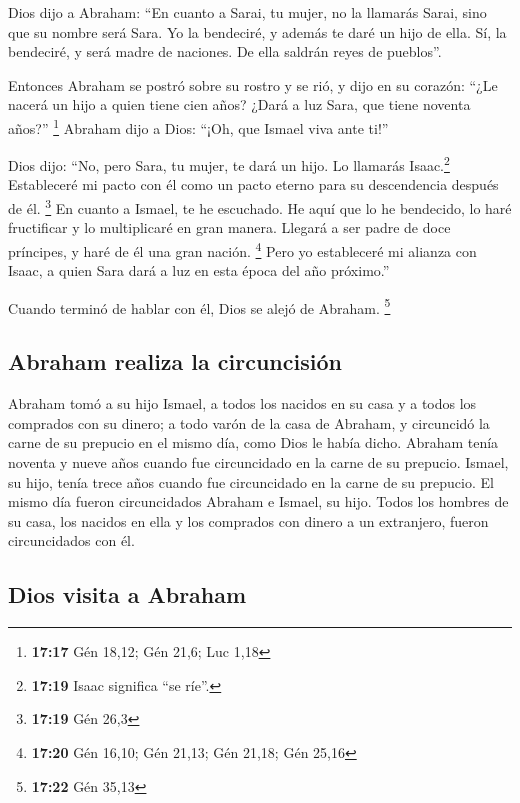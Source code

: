  Dios dijo a Abraham: ``En cuanto a Sarai, tu mujer, no
la llamarás Sarai, sino que su nombre será Sara.  Yo la
bendeciré, y además te daré un hijo de ella. Sí, la bendeciré, y será
madre de naciones. De ella saldrán reyes de pueblos''.

 Entonces Abraham se postró sobre su rostro y se rió, y
dijo en su corazón: ``¿Le nacerá un hijo a quien tiene cien años? ¿Dará
a luz Sara, que tiene noventa años?'' \footnote{\textbf{17:17} Gén
  18,12; Gén 21,6; Luc 1,18}  Abraham dijo a Dios: ``¡Oh,
que Ismael viva ante ti!''

 Dios dijo: ``No, pero Sara, tu mujer, te dará un hijo.
Lo llamarás Isaac.\footnote{\textbf{17:19} Isaac significa ``se ríe''.}
Estableceré mi pacto con él como un pacto eterno para su descendencia
después de él. \footnote{\textbf{17:19} Gén 26,3}  En
cuanto a Ismael, te he escuchado. He aquí que lo he bendecido, lo haré
fructificar y lo multiplicaré en gran manera. Llegará a ser padre de
doce príncipes, y haré de él una gran nación. \footnote{\textbf{17:20}
  Gén 16,10; Gén 21,13; Gén 21,18; Gén 25,16}  Pero yo
estableceré mi alianza con Isaac, a quien Sara dará a luz en esta época
del año próximo.''

 Cuando terminó de hablar con él, Dios se alejó de
Abraham. \footnote{\textbf{17:22} Gén 35,13}

\hypertarget{abraham-realiza-la-circuncisiuxf3n}{%
\subsection{Abraham realiza la
circuncisión}\label{abraham-realiza-la-circuncisiuxf3n}}

 Abraham tomó a su hijo Ismael, a todos los nacidos en su
casa y a todos los comprados con su dinero; a todo varón de la casa de
Abraham, y circuncidó la carne de su prepucio en el mismo día, como Dios
le había dicho.  Abraham tenía noventa y nueve años
cuando fue circuncidado en la carne de su prepucio. 
Ismael, su hijo, tenía trece años cuando fue circuncidado en la carne de
su prepucio.  El mismo día fueron circuncidados Abraham e
Ismael, su hijo.  Todos los hombres de su casa, los
nacidos en ella y los comprados con dinero a un extranjero, fueron
circuncidados con él.

\hypertarget{dios-visita-a-abraham}{%
\subsection{Dios visita a Abraham}\label{dios-visita-a-abraham}}

